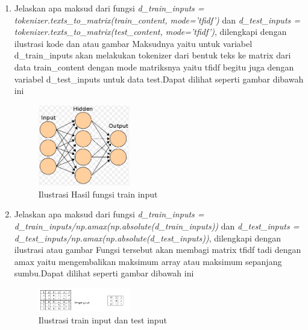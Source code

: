 \begin{enumerate}
        \item {Jelaskan apa maksud dari fungsi \emph{d\_train\_inputs = tokenizer.texts\_to\_matrix(train\_content, mode='tfidf')} dan \emph{d\_test\_inputs = tokenizer.texts\_to\_matrix(test\_content, mode='tfidf')}, dilengkapi dengan ilustrasi kode dan atau gambar} 
        \subitem Maksudnya yaitu untuk variabel d\_train\_inputs akan melakukan tokenizer dari bentuk teks ke matrix dari data train\_content dengan mode matriksnya yaitu tfidf begitu juga dengan variabel d\_test\_inputs untuk data test.Dapat dilihat seperti gambar dibawah ini
        \begin{figure}[H]
            \includegraphics[width=4cm]{figures/1174039/chapter7/6.png}
            \centering
            \caption{Ilustrasi Hasil fungsi train input}
        \end{figure}

        \item {Jelaskan apa maksud dari fungsi \emph{d\_train\_inputs = d\_train\_inputs/np.amax(np.absolute(d\_train\_inputs))} dan \emph{d\_test\_inputs = d\_test\_inputs/np.amax(np.absolute(d\_test\_inputs))}, dilengkapi dengan ilustrasi atau gambar}
        \subitem Fungsi tersebut akan membagi matrix tfidf tadi dengan amax yaitu mengembalikan maksimum array atau maksimum sepanjang sumbu.Dapat dilihat seperti gambar dibawah ini
        \begin{figure}[H]
            \includegraphics[width=4cm]{figures/1174039/chapter7/7.png}
            \centering
            \caption{Ilustrasi train input dan test input}
        \end{figure}


\end{enumerate}
